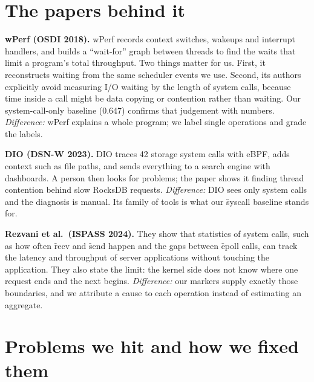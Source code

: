 \documentclass[11pt]{article}
\begin{document}
\section{The papers behind it}

\textbf{wPerf (OSDI 2018).} wPerf records context switches, wakeups and interrupt handlers, and builds a ``wait-for'' graph between threads to find the waits that limit a program's total throughput. Two things matter for us. First, it reconstructs waiting from the same scheduler events we use. Second, its authors explicitly avoid measuring I/O waiting by the length of system calls, because time inside a call might be data copying or contention rather than waiting. Our system-call-only baseline (0.647) confirms that judgement with numbers. \emph{Difference:} wPerf explains a whole program; we label single operations and grade the labels.

\textbf{DIO (DSN-W 2023).} DIO traces 42 storage system calls with eBPF, adds context such as file paths, and sends everything to a search engine with dashboards. A person then looks for problems; the paper shows it finding thread contention behind slow RocksDB requests. \emph{Difference:} DIO sees only system calls and the diagnosis is manual. Its family of tools is what our \f{syscall} baseline stands for.

\textbf{Rezvani et al.\ (ISPASS 2024).} They show that statistics of system calls, such as how often \f{recv} and \f{send} happen and the gaps between \f{epoll} calls, can track the latency and throughput of server applications without touching the application. They also state the limit: the kernel side does not know where one request ends and the next begins. \emph{Difference:} our markers supply exactly those boundaries, and we attribute a cause to each operation instead of estimating an aggregate.

\section{Problems we hit and how we fixed them}
\end{document}
